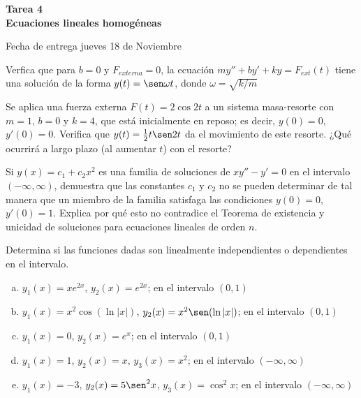 \documentclass[12pt]{exam}
\begin{document}
\centering


\Large 
\textbf{\huge Tarea 4\\ \large Ecuaciones lineales homogéneas}

\small
Fecha de entrega jueves 18 de Noviembre
\vskip10pt

\normalsize

\pointformat{\bfseries\boldmath(\thepoints)}
\vskip10pt

    
    \begin{questions}
     \question%
     Verfica que para $b=0$ y $F_{externa}=0$, la ecuación $my''+by'+ky=F_{ext}(t)$ tiene una solución de la forma $y(t)=\sen \omega t$, donde $\omega=\sqrt{k/m}$
     

     \question%
     Se aplica una fuerza externa $F(t)=2\cos2t$ a un sistema masa-resorte con $m=1$, $b=0$ y $k=4$, que está inicialmente en reposo; es decir, $y(0)=0$, $y'(0)=0$. Verifica que $y(t)=\frac{1}{2}t\sen2t$ da el movimiento de este resorte. ¿Qué ocurrirá a largo plazo (al aumentar $t$) con el resorte?

     
     \question%
      Si $y(x)=c_1+c_2x^2$ es una familia de soluciones de $xy''-y'=0$ en el intervalo $(-\infty,\infty)$, demuestra que las constantes $c_1$ y $c_2$ no se pueden determinar de tal manera que un miembro de la familia satisfaga las condiciones $y(0)=0$, $y'(0)=1$. Explica  por qué esto no contradice el Teorema de existencia y unicidad de soluciones para ecuaciones lineales de orden $n$.
     


     \question%
     Determina si las funciones dadas son linealmente independientes o dependientes en el intervalo.
     \begin{enumerate}[a)]
         \item $y_1(x)=xe^{2x}$, $y_2(x)=e^{2x}$; en el intervalo $(0,1)$
         \item $y_1(x)=x^2\cos(\ln|x|)$, $y_2(x)=x^2\sen(\ln|x|)$; en el intervalo $(0,1)$
         \item $y_1(x)=0$, $y_2(x)=e^x$; en el intervalo $(0,1)$
         \item $y_1(x)=1$, $y_2(x)=x$, $y_3(x)=x^2$; en el intervalo $(-\infty,\infty)$
         \item $y_1(x)=-3$, $y_2(x)=5\sen^2x$, $y_3(x)=\cos^2x$; en el intervalo $(-\infty,\infty)$
     \end{enumerate}






\end{questions}
\end{document}

